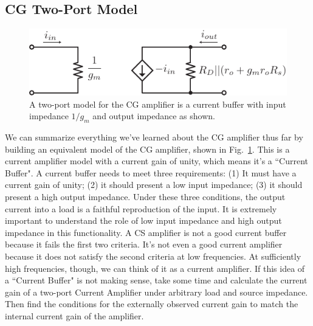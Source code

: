\subsection{CG Two-Port Model}
\begin{figure}[tb]
\centering
\includegraphics[scale=.9]{cg_model}
\caption{A two-port model for the CG amplifier is a current buffer with input impedance $1/g_m$ and output impedance as shown.}
\label{fig:cg_model}
\end{figure}
We can summarize everything we've learned about the CG amplifier thus far by building an equivalent model of the CG amplifier, shown in Fig.~\ref{fig:cg_model}.  This is a current amplifier model with a current gain of unity, which means it's a ``Current Buffer".  A current buffer needs to meet three requirements:  (1) It must have a current gain of unity; (2) it should present a low input impedance;  (3) it should present a high output impedance.  Under these three conditions, the output current into a load is a faithful reproduction of the input.  It is extremely important to understand the role of low input impedance and high output impedance in this functionality.  A CS amplifier is not a good current buffer because it fails the first two criteria.  It's not even a good current amplifier because it does not satisfy the second criteria at low frequencies.  At sufficiently high frequencies, though, we can think of it as a current amplifier.   If this idea of a ``Current Buffer" is not making sense, take some time and calculate the current gain of a two-port Current Amplifier under arbitrary load and source impedance.  Then find the conditions for the externally observed current gain to match the internal current gain of the amplifier.
